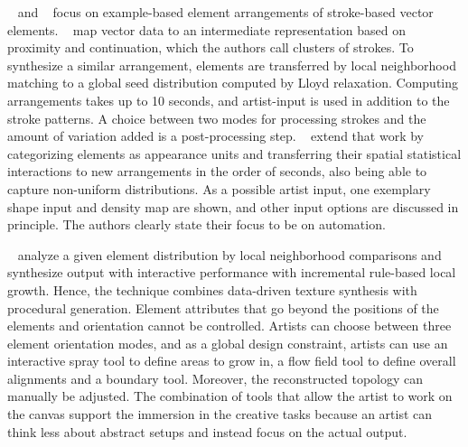 \citeauthor*{barla_2006_spa}~\cite{barla_2006_spa} and \citeauthor*{hurtut_2009_ags}~\cite{hurtut_2009_ags} focus on example-based element arrangements of stroke-based vector elements. \citeauthor*{barla_2006_spa}~\cite{barla_2006_spa} map vector data to an intermediate representation based on proximity and continuation, which the authors call clusters of strokes. To synthesize a similar arrangement, elements are transferred by local neighborhood matching to a global seed distribution computed by Lloyd relaxation. Computing arrangements takes up to 10 seconds, and artist-input is used in addition to the stroke patterns. A choice between two modes for processing strokes and the amount of variation added is a post-processing step. \citeauthor*{hurtut_2009_ags}~\cite{hurtut_2009_ags} extend that work by categorizing elements as appearance units and transferring their spatial statistical interactions to new arrangements in the order of seconds, also being able to capture non-uniform distributions. As a possible artist input, one exemplary shape input and density map are shown, and other input options are discussed in principle. The authors clearly state their focus to be on automation.

 \citeauthor*{ijiri_2008_aeb}~\cite{ijiri_2008_aeb} analyze a given element distribution by local neighborhood comparisons and synthesize output with interactive performance with incremental rule-based local growth. Hence, the technique combines data-driven texture synthesis with procedural generation. Element attributes that go beyond the positions of the elements and orientation cannot be controlled. Artists can choose between three element orientation modes, and as a global design constraint, artists can use an interactive spray tool to define areas to grow in, a flow field tool to define overall alignments and a boundary tool. Moreover, the reconstructed topology can manually be adjusted. The combination of tools that allow the artist to work on the canvas support the immersion in the creative tasks because an artist can think less about abstract setups and instead focus on the actual output.

